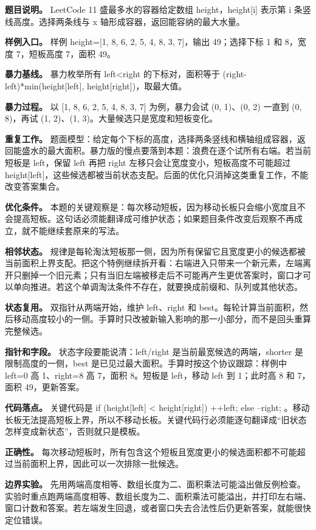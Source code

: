 \textbf{题目说明。} LeetCode 11 盛最多水的容器给定数组 height，height[i] 表示第 i 条竖线高度。选择两条线与 x 轴形成容器，返回能容纳的最大水量。

\textbf{样例入口。} 样例 height=[1, 8, 6, 2, 5, 4, 8, 3, 7]，输出 49；选择下标 1 和 8，宽度 7，短板高度 7，面积 49。

\textbf{暴力基线。} 暴力枚举所有 left<right 的下标对，面积等于 (right-left)*min(height[left], height[right])，取最大值。

\textbf{暴力过程。} 以 [1, 8, 6, 2, 5, 4, 8, 3, 7] 为例，暴力会试 (0, 1)、(0, 2) 一直到 (0, 8)，再试 (1, 2)、(1, 3)。大量候选只是宽度和短板变化。

\textbf{重复工作。} 题面模型：给定每个下标的高度，选择两条竖线和横轴组成容器，返回能盛水的最大面积。暴力版的慢点要落到本题：浪费在逐个试所有右端。若当前短板是 left，保留 left 再把 right 左移只会让宽度变小，短板高度不可能超过 height[left]，这些候选都被当前状态支配。后面的优化只消掉这类重复工作，不能改变答案集合。

\textbf{优化条件。} 本题的关键观察是：每次移动短板，因为移动长板只会缩小宽度且不会提高短板。这句话必须能翻译成可维护状态；如果题目条件改变后观察不再成立，就不能继续套原来的写法。

\textbf{相邻状态。} 规律是每轮淘汰短板那一侧，因为所有保留它且宽度更小的候选都被当前面积上界支配。把这个特例继续拆开看：右端进入只带来一个新元素，左端离开只删掉一个旧元素；只有当旧左端被移走后不可能再产生更优答案时，窗口才可以单向推进。若这个单调淘汰条件不存在，就要换成前缀和、队列或其他状态。

\textbf{状态复用。} 双指针从两端开始，维护 left、right 和 best。每轮计算当前面积，然后移动高度较小的一侧。手算时只改被新输入影响的那一小部分，而不是回头重算完整候选。

\textbf{指针和字段。} 状态字段要能说清：left/right 是当前最宽候选的两端，shorter 是限制高度的一侧，best 是已见过最大面积。手算时按这个协议跟踪：样例中 left=0 高 1、right=8 高 7，面积 8。短板是 left，移动 left 到 1；此时高 8 和 7，面积 49，更新答案。

\textbf{代码落点。} 关键代码是 if (height[left] < height[right]) ++left; else --right; 。移动长板无法提高短板上界，所以不移动长板。关键代码行必须能逐句翻译成“旧状态怎样变成新状态”，否则就只是模板。

\textbf{正确性。} 每次移动短板时，所有包含这个短板且宽度更小的候选面积都不可能超过当前面积上界，因此可以一次排除一批候选。

\textbf{边界实验。} 先用两端高度相等、数组长度为二、面积乘法可能溢出做反例检查。实验时重点跑两端高度相等、数组长度为二、面积乘法可能溢出，并打印左右端、窗口计数和答案。若左端发生回退，或者窗口失去合法性后仍更新答案，就能很快定位错误。

